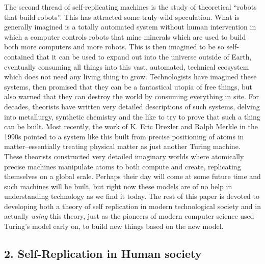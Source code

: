 The second thread of self-replicating machines is the study of
theoretical ``robots that build robots''. This has attracted some truly
wild speculation. What is generally imagined is a totally automated
system without human intervention in which a computer controls robots
that mine minerals which are used to build both more computers and more
robots. This is then imagined to be so self-contained that it can be
used to expand out into the universe outside of Earth, eventually
consuming all things into this vast, automated, technical ecosystem
which does not need any living thing to grow. Technologists have
imagined these systems, then promised that they can be a fantastical
utopia of free things, but also warned that they can destroy the world
by consuming everything in site. For decades, theorists have written
very detailed descriptions of such systems, delving into metallurgy,
synthetic chemistry and the like to try to prove that such a thing can
be built. Most recently, the work of K. Eric Drexler and Ralph Merkle in
the 1990s pointed to a system like this built from precise positioning
of atoms in matter--essentially treating physical matter as just another
Turing machine. These theorists constructed very detailed imaginary
worlds where atomically precise machines manipulate atoms to both
compute and create, replicating themselves on a global scale. Perhaps
their day will come at some future time and such machines will be built,
but right now these models are of no help in understanding technology as
we find it today. The rest of this paper is devoted to developing both a
theory of self replication in modern technological society and in
actually \emph{using} this theory, just as the pioneers of modern
computer science used Turing's model early on, to build new things based
on the new model.

\subsection{2. Self-Replication in Human
society}\label{self-replication-in-human-society}

